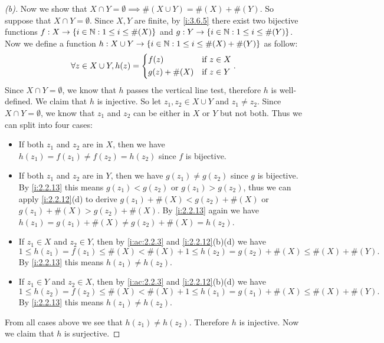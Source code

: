 \begin{proof}[(b)]
  Now we show that \(X \cap Y = \emptyset \implies \#(X \cup Y) = \#(X) + \#(Y)\).
  So suppose that \(X \cap Y = \emptyset\).
  Since \(X, Y\) are finite, by \cref{i:3.6.5} there exist two bijective functions \(f : X \to \left\lbrace i \in \mathbb{N} : 1 \leq i \leq \#(X)\right\rbrace\) and \(g : Y \to \left\lbrace i \in \mathbb{N} : 1 \leq i \leq \#(Y)\right\rbrace\).
  Now we define a function \(h : X \cup Y \to \left\lbrace i \in \mathbb{N} : 1 \leq i \leq \#(X) + \#(Y)\right\rbrace\) as follow:
  \[
    \forall z \in X \cup Y, h(z) = \begin{dcases}
      f(z)         & \text{if } z \in X \\
      g(z) + \#(X) & \text{if } z \in Y
    \end{dcases}.
  \]
  Since \(X \cap Y = \emptyset\), we know that \(h\) passes the vertical line test, therefore \(h\) is well-defined.
  We claim that \(h\) is injective.
  So let \(z_1, z_2 \in X \cup Y\) and \(z_1 \neq z_2\).
  Since \(X \cap Y = \emptyset\), we know that \(z_1\) and \(z_2\) can be either in \(X\) or \(Y\) but not both.
  Thus we can split into four cases:
  \begin{itemize}
    \item If both \(z_1\) and \(z_2\) are in \(X\), then we have \(h(z_1) = f(z_1) \neq f(z_2) = h(z_2)\) since \(f\) is bijective.
    \item If both \(z_1\) and \(z_2\) are in \(Y\), then we have \(g(z_1) \neq g(z_2)\) since \(g\) is bijective.
          By \cref{i:2.2.13} this means \(g(z_1) < g(z_2)\) or \(g(z_1) > g(z_2)\), thus we can apply \cref{i:2.2.12}(d) to derive \(g(z_1) + \#(X) < g(z_2) + \#(X)\) or \(g(z_1) + \#(X) > g(z_2) + \#(X)\).
          By \cref{i:2.2.13} again we have \(h(z_1) = g(z_1) + \#(X) \neq g(z_2) + \#(X) = h(z_2)\).
    \item If \(z_1 \in X\) and \(z_2 \in Y\), then by \cref{i:ac:2.2.3} and \cref{i:2.2.12}(b)(d) we have
          \[
            1 \leq h(z_1) = f(z_1) \leq \#(X) < \#(X) + 1 \leq h(z_2) = g(z_2) + \#(X) \leq \#(X) + \#(Y).
          \]
          By \cref{i:2.2.13} this means \(h(z_1) \neq h(z_2)\).
    \item If \(z_1 \in Y\) and \(z_2 \in X\), then by \cref{i:ac:2.2.3} and \cref{i:2.2.12}(b)(d) we have
          \[
            1 \leq h(z_2) = f(z_2) \leq \#(X) < \#(X) + 1 \leq h(z_1) = g(z_1) + \#(X) \leq \#(X) + \#(Y).
          \]
          By \cref{i:2.2.13} this means \(h(z_1) \neq h(z_2)\).
  \end{itemize}
  From all cases above we see that \(h(z_1) \neq h(z_2)\).
  Therefore \(h\) is injective.
  Now we claim that \(h\) is surjective.

\end{proof}
